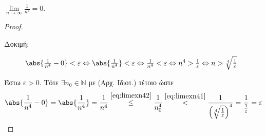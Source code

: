 \documentclass[main.tex]{subfiles}
\begin{document}
\begin{examples}
\begin{enumerate}[i)]
        \item $ \lim\limits_{n \to \infty} \frac{1}{n^{4}} = 0 $. 
            \begin{proof}
            \item {}
                \begin{description}
                    \item[Δοκιμή:]$ \abs{\frac{1}{n^{4}} - 0} < \varepsilon 
                        \Leftrightarrow \abs{\frac{1}{n^{4}}} < \varepsilon 
                        \Leftrightarrow \frac{1}{n^{4}} < \varepsilon
                        \Leftrightarrow n^{4} > \frac{1}{\varepsilon}
                        \Leftrightarrow n > \sqrt[4]{\frac{1}{\varepsilon}}$
                \end{description}
                Έστω $ \varepsilon >0 $. Τότε $ \exists n_{0}  \in 
                \mathbb{N}$ με  (Αρχ. Ιδιοτ.)
                τέτοιο ώστε  
                \[
                    \abs{\frac{1}{n^{4}} - 0 } = \abs{\frac{1}{n^{4}}} 
                    = \frac{1}{n^{4}} \overset{\eqref{eq:limexn42}}\leq 
                    \frac{1}{n_{0}^{4}} \overset{\eqref{eq:limexn41}}{<}
                    \frac{1}{\left(\sqrt[4]{\frac{1}{\varepsilon}
                    }\right)^{4}} = \frac{1}{\frac{1}{\varepsilon}} =  
                    \varepsilon
                \] 
            \end{proof}


\end{enumerate}
\end{examples}
\end{document}
